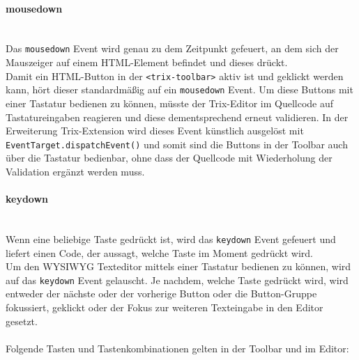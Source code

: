 \paragraph{mousedown}\mbox{}\\
Das \texttt{mousedown} Event wird genau zu dem Zeitpunkt gefeuert, an dem sich der Mauszeiger auf einem HTML-Element befindet und dieses drückt.\\
Damit ein HTML-Button in der \texttt{<trix-toolbar>} aktiv ist und geklickt werden kann, hört dieser standardmäßig auf ein \texttt{mousedown} Event. Um diese Buttons mit einer Tastatur bedienen zu können, müsste der Trix-Editor im Quellcode auf Tastatureingaben reagieren und diese dementsprechend erneut validieren. In der Erweiterung Trix-Extension wird dieses Event künstlich ausgelöst mit \texttt{EventTarget.dispatchEvent()} und somit sind die Buttons in der Toolbar auch über die Tastatur bedienbar, ohne dass der Quellcode mit Wiederholung der Validation ergänzt werden muss.

\paragraph{keydown}\mbox{}\\
Wenn eine beliebige Taste gedrückt ist, wird das \texttt{keydown} Event gefeuert und liefert einen Code, der aussagt, welche Taste im Moment gedrückt wird.\\
Um den WYSIWYG Texteditor mittels einer Tastatur bedienen zu können, wird auf das \texttt{keydown} Event gelauscht. Je nachdem, welche Taste gedrückt wird, wird entweder der nächste oder der vorherige Button oder die Button-Gruppe fokussiert, geklickt oder der Fokus zur weiteren Texteingabe in den Editor gesetzt.\\
\\Folgende Tasten und Tastenkombinationen gelten in der Toolbar und im Editor:

